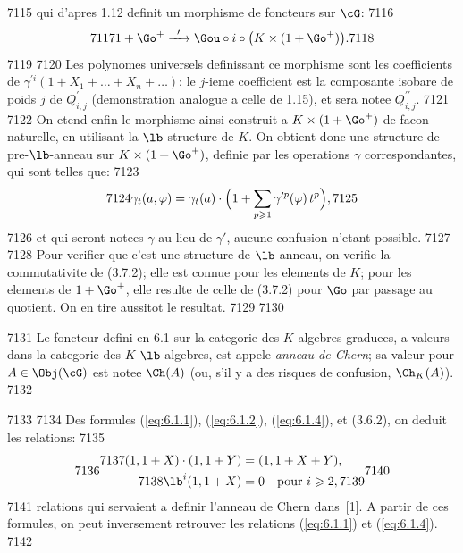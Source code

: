  7115	qui d'apres 1.12 definit un morphisme de foncteurs sur $\cG$:
  7116	\[
  7117	1 + \Go^+ \xrightarrow{\;\;\prime\;\;} \Gou \circ i \circ \bigl(K \times (1 + \Go^+)\bigr).
  7118	\]
  7119	
  7120	Les polynomes universels definissant ce morphisme sont les coefficients de $\gamma^{\prime i}(1+X_1+\ldots+X_n+\ldots)$; le $j$-ieme coefficient est la composante isobare de poids $j$ de $Q^\prime_{i,j}$ (demonstration analogue a celle de 1.15), et sera notee $Q^{\prime\prime}_{i,j}$.
  7121	
  7122	On etend enfin le morphisme ainsi construit a $K \times (1 + \Go^+)$ de facon naturelle, en utilisant la $\lb$-structure de $K$. On obtient donc une structure de pre-$\lb$-anneau sur $K \times (1 + \Go^+)$, definie par les operations $\gamma$ correspondantes, qui sont telles que:
  7123	\begin{equation}\label{eq:6.1.4}
  7124	\gamma_t(a, \varphi) = \gamma_t(a) \cdot \Bigl(1 + \sum_{p \geqslant 1} \gamma^{\prime p}(\varphi)\, t^p\Bigr),
  7125	\end{equation}
  7126	et qui seront notees $\gamma$ au lieu de $\gamma'$, aucune confusion n'etant possible.
  7127	
  7128	Pour verifier que c'est une structure de $\lb$-anneau, on verifie la commutativite de (3.7.2); elle est connue pour les elements de $K$; pour les elements de $1 + \Go^+$, elle resulte de celle de (3.7.2) pour $\Go$ par passage au quotient. On en tire aussitot le resultat.
  7129	
  7130	\begin{dfn}
  7131	Le foncteur defini en 6.1 sur la categorie des $K$-algebres graduees, a valeurs dans la categorie des $K$-$\lb$-algebres, est appele \emph{anneau de Chern}; sa valeur pour $A \in \Obj(\cG)$ est notee $\Ch(A)$ (ou, s'il y a des risques de confusion, $\Ch_K(A)$).
  7132	\end{dfn}
  7133	
  7134	Des formules (\ref{eq:6.1.1}), (\ref{eq:6.1.2}), (\ref{eq:6.1.4}), et (3.6.2), on deduit les relations:
  7135	\begin{equation}\label{eq:6.2.1}
  7136	\begin{aligned}
  7137	(1, 1+X) \cdot (1, 1+Y) &= (1, 1+X+Y),\\
  7138	\lb^i(1, 1+X) &= 0 \quad \text{pour } i \geqslant 2,
  7139	\end{aligned}
  7140	\end{equation}
  7141	relations qui servaient a definir l'anneau de Chern dans~[1]. A partir de ces formules, on peut inversement retrouver les relations (\ref{eq:6.1.1}) et (\ref{eq:6.1.4}).
  7142	
